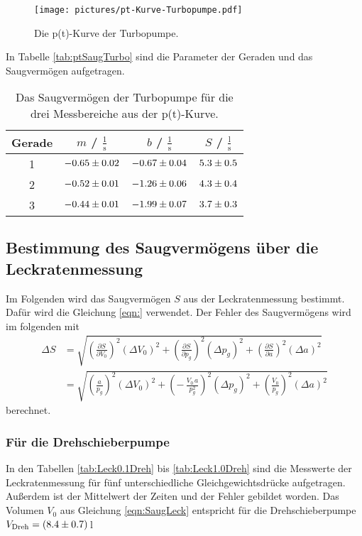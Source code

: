 \begin{figure} %
  \centering
  \texttt{[image: pictures/pt-Kurve-Turbopumpe.pdf]}
  \caption{Die p(t)-Kurve der Turbopumpe.}
  \label{fig:ptturbo}
\end{figure}

In Tabelle \eqref{tab:ptSaugTurbo} sind die Parameter der Geraden und das Saugvermögen aufgetragen.

\begin{table}
  \centering
  \caption{Das Saugvermögen der Turbopumpe für die drei Messbereiche aus der p(t)-Kurve.}
  \label{tab:ptSaugTurbo}
    \begin{tabular}{c|c|c|c}
      Gerade & $m$ / $\frac{1}{\text{s}}$ & $b$ / $\frac{1}{\text{s}}$ & $S$ / $\frac{\text{l}}{\text{s}}$ \\
      \midrule
      1 & $\num{-0.65 +- 0.02}$ & $\num{-0.67 +- 0.04}$ & $\num{5.3 +- 0.5}$\\
      2 & $\num{-0.52 +- 0.01}$ & $\num{-1.26 +- 0.06}$ & $\num{4.3 +- 0.4}$\\
      3 & $\num{-0.44 +- 0.01}$ & $\num{-1.99 +- 0.07}$ & $\num{3.7 +- 0.3}$\\
    \end{tabular}
\end{table}



\subsection{Bestimmung des Saugvermögens über die Leckratenmessung}
Im Folgenden wird das Saugvermögen $S$ aus der Leckratenmessung bestimmt. Dafür wird die Gleichung \eqref{eqn:} verwendet. Der Fehler des Saugvermögens wird im folgenden mit
\begin{align}
  \Delta S &= \sqrt{ \left(\frac{\partial S}{\partial V_0} \right)^2 (\Delta V_0)^2 + \left(\frac{\partial S}{\partial p_g} \right)^2 (\Delta p_g)^2 + \left(\frac{\partial S}{\partial a} \right)^2 (\Delta a)^2 } \nonumber \\
  &= \sqrt{ \left(\frac{a}{p_g} \right)^2 (\Delta V_0)^2 + \left(-\,\frac{V_0\,a}{p_g^2} \right)^2 (\Delta p_g)^2 + \left(\frac{V_0}{p_g} \right)^2 (\Delta a)^2 }
\end{align}
berechnet.

\subsubsection{Für die Drehschieberpumpe}
In den Tabellen \eqref{tab:Leck0.1Dreh} bis \eqref{tab:Leck1.0Dreh} sind die Messwerte der Leckratenmessung für fünf unterschiedliche Gleichgewichtsdrücke aufgetragen. Außerdem ist der Mittelwert der Zeiten und der Fehler gebildet worden. Das Volumen $V_0$ aus Gleichung \eqref{eqn:SaugLeck} entspricht für die Drehschieberpumpe $V_\text{Dreh} = (\num{8.4 +- 0.7})$\,l

